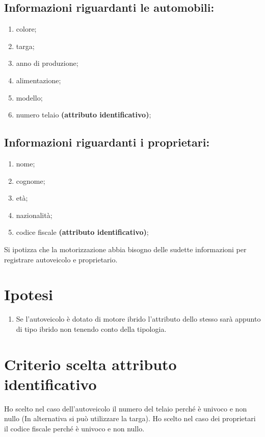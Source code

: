\documentclass[12pt]{article}
\begin{document}
\subsection{Informazioni riguardanti le automobili:}
\begin{enumerate}
    \item colore;
    \item targa;
    \item anno di produzione;
    \item alimentazione; 
    \item modello;
    \item numero telaio \textbf{(attributo identificativo)};
\end{enumerate}

\subsection{Informazioni riguardanti i proprietari:}
\begin{enumerate}
    \item nome;
    \item cognome;
    \item età;
    \item nazionalità;
    \item codice fiscale \textbf{(attributo identificativo)};
\end{enumerate}

\noindent
Si ipotizza che la motorizzazione abbia bisogno delle sudette informazioni per registrare autoveicolo e proprietario.

\clearpage


\section{Ipotesi}
\begin{enumerate}
    \item Se l'autoveicolo è dotato di motore ibrido l'attributo dello stesso sarà appunto di tipo ibrido non tenendo conto della tipologia.
\end{enumerate}


\section{Criterio scelta attributo identificativo}
\noindent
Ho scelto nel caso dell'autoveicolo il numero del telaio perché è univoco e non nullo (In alternativa si può utilizzare la targa). \newline
Ho scelto nel caso dei proprietari il codice fiscale perché è univoco e non nullo.
\end{document}
